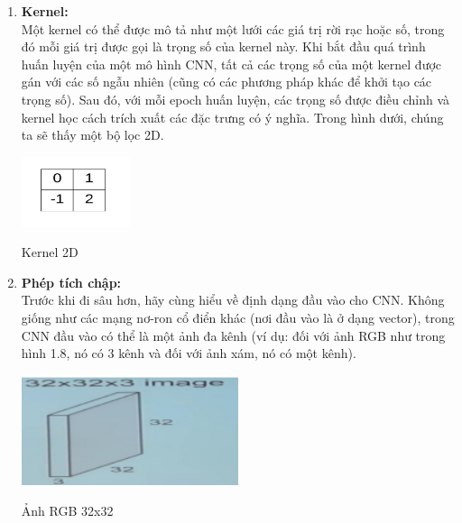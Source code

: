 \begin{enumerate}
    \item \textbf{Kernel: } \\
    Một kernel có thể được mô tả như một lưới các giá trị rời rạc hoặc số, trong đó mỗi giá trị được gọi là trọng số của kernel này. Khi bắt đầu quá trình huấn luyện của một mô hình CNN, tất cả các trọng số của một kernel được gán với các số ngẫu nhiên (cũng có các phương pháp khác để khởi tạo các trọng số). Sau đó, với mỗi epoch huấn luyện, các trọng số được điều chỉnh và kernel học cách trích xuất các đặc trưng có ý nghĩa. Trong hình dưới, chúng ta sẽ thấy một bộ lọc 2D. 
    
    \begin{minipage}{\linewidth}
        \captionsetup{type=figure}
        \centering
        \includegraphics[width=0.25\textwidth]{images/kernel_example.png}
        \caption{Kernel 2D}
    \end{minipage}

    \item \textbf{Phép tích chập: } \\
    Trước khi đi sâu hơn, hãy cùng hiểu về định dạng đầu vào cho CNN. Không giống như các mạng nơ-ron cổ điển khác (nơi đầu vào là ở dạng vector), trong CNN đầu vào có thể là một ảnh đa kênh (ví dụ: đối với ảnh RGB như trong hình 1.8, nó có 3 kênh và đối với ảnh xám, nó có một kênh).\\
    
    \begin{minipage}{\linewidth}
            \captionsetup{type=figure}
            \centering
            \includegraphics[width=0.5\textwidth]{images/image_rgb.png}
            \caption{Ảnh RGB 32x32}
    \end{minipage}


\end{enumerate}
